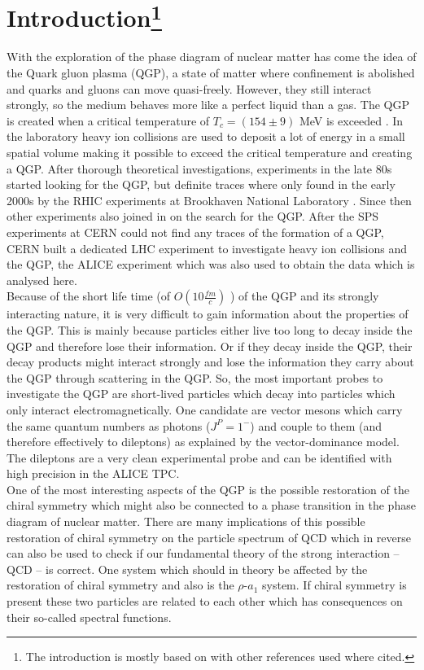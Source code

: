 \section{Introduction\footnote{The introduction is mostly based on \cite{ChiSym} with other references used where cited.}}
\label{sec:Introduction}
With the exploration of the phase diagram of nuclear matter has come the idea of the Quark gluon plasma (QGP), a state of matter where confinement is abolished and quarks and gluons can move quasi-freely. However, they still interact strongly, so the medium behaves more like a perfect liquid than a gas. The QGP is created when a critical temperature of $T_c = (154 \pm 9)$ MeV is exceeded \cite{tcrit}. In the laboratory heavy ion collisions are used to deposit a lot of energy in a small spatial volume making it possible to exceed the critical temperature and creating a QGP. After thorough theoretical investigations, experiments in the late 80s started looking for the QGP, but definite traces where only found in the early 2000s by the RHIC experiments at Brookhaven National Laboratory \cite{QGPrhic}. Since then other experiments also joined in on the search for the QGP. After the SPS experiments at CERN could not find any traces of the formation of a QGP, CERN built a dedicated LHC experiment to investigate heavy ion collisions and the QGP, the ALICE experiment \cite{ALICEproposal} which was also used to obtain the data which is analysed here. \\
Because of the short life time (of $O(10 \frac{fm}{c})$ \cite{QGPlifetime}) of the QGP and its strongly interacting nature, it is very difficult to gain information about the properties of the QGP. This is mainly because particles either live too long to decay inside the QGP and therefore lose their information. Or if they decay inside the QGP, their decay products might interact strongly and lose the information they carry about the QGP through scattering in the QGP. So, the most important probes to investigate the QGP are short-lived particles which decay into particles which only interact electromagnetically. One candidate are vector mesons which carry the same quantum numbers as photons ($J^P = 1^{-}$) and couple to them (and therefore effectively to dileptons) as explained by the vector-dominance model. The dileptons are a very clean experimental probe and can be identified with high precision in the ALICE TPC. \\
One of the most interesting aspects of the QGP is the possible restoration of the chiral symmetry which might also be connected to a phase transition in the phase diagram of nuclear matter. There are many implications of this possible restoration of chiral symmetry on the particle spectrum of QCD which in reverse can also be used to check if our fundamental theory of the strong interaction -- QCD -- is correct. One system which should in theory be affected by the restoration of chiral symmetry and also  is the $\rho$-$a_1$ system. If chiral symmetry is present these two particles are related to each other which has consequences on their so-called spectral functions. \\
